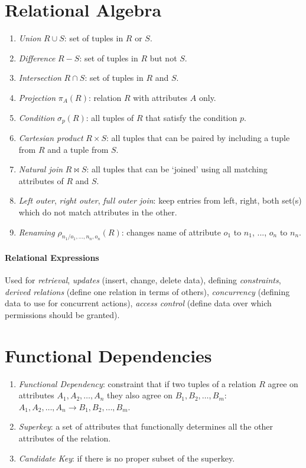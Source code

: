 \documentclass[twocolumn,english]{article}
\begin{document}
\section{Relational Algebra}
\begin{enumerate}
\item \emph{Union} $R\cup S$: set of tuples in $R$ or $S$.
\item \emph{Difference} $R-S$: set of tuples in $R$ but not $S$.
\item \emph{Intersection} $R\cap S$: set of tuples in $R$ and $S$.
\item \emph{Projection} $\pi_{A}(R)$: relation $R$ with attributes $A$
only.
\item \emph{Condition} $\sigma_{p}(R)$: all tuples of $R$ that satisfy
the condition $p$.
\item \emph{Cartesian product} $R\times S$: all tuples that can be paired
by including a tuple from $R$ and a tuple from $S$.
\item \emph{Natural join} $R\bowtie S$: all tuples that can be `joined'
using all matching attributes of $R$ and $S$.
\item \emph{Left outer}, \emph{right outer}, \emph{full outer join}: keep
entries from left, right, both set(s) which do not match attributes
in the other.
\item \emph{Renaming} $\rho_{n_{1}/o_{1},\dots,n_{n},o_{n}}(R)$: changes
name of attribute $o_{1}$ to $n_{1}$, ..., $o_{n}$ to $n_{n}$.
\end{enumerate}

\paragraph{Relational Expressions}

Used for \emph{retrieval}, \emph{updates} (insert, change, delete
data), defining \emph{constraints}, \emph{derived relations} (define
one relation in terms of others), \emph{concurrency} (defining data
to use for concurrent actions), \emph{access control} (define data
over which permissions should be granted).


\section{Functional Dependencies}
\begin{enumerate}
\item \emph{Functional Dependency}: constraint that if two tuples of a relation
$R$ agree on attributes $A_{1},A_{2},\dots,A_{n}$ they also agree
on $B_{1},B_{2},\dots,B_{m}$: $A_{1},A_{2},\dots,A_{n}\rightarrow B_{1},B_{2},\dots,B_{m}$.
\item \emph{Superkey}: a set of attributes that functionally determines
all the other attributes of the relation.
\item \emph{Candidate Key}: if there is no proper subset of the superkey.
\end{enumerate}
\end{document}
